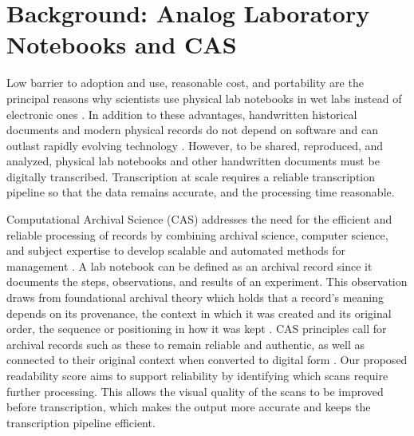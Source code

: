 \documentclass[conference]{IEEEtran}
\begin{document}
\section{Background: Analog Laboratory Notebooks and CAS}
Low barrier to adoption and use, reasonable cost, and portability are the
principal reasons why scientists use physical lab notebooks in wet labs instead
of electronic ones \cite{kanza2017}. In addition to these advantages,
handwritten historical documents and modern physical records do not depend on
software and can outlast rapidly evolving technology \cite{ryan2007}. However,
to be shared, reproduced, and analyzed, physical lab notebooks and other
handwritten documents must be digitally transcribed. Transcription at scale
requires a reliable transcription pipeline so that the data remains accurate,
and the processing time reasonable.

Computational Archival Science (CAS) addresses the need for the efficient and
reliable processing of records by combining archival science, computer science,
and subject expertise to develop scalable and automated methods for management
\cite{marciano2018}. A lab notebook can be defined as an archival record since
it documents the steps, observations, and results of an experiment. This
observation draws from foundational archival theory which holds that a record's
meaning depends on its provenance, the context in which it was created and its
original order, the sequence or positioning in how it was kept
\cite{jenkinson1922}. CAS principles call for archival records such as these to
remain reliable and authentic, as well as connected to their original context
when converted to digital form \cite{hedges2022}. Our proposed readability
score aims to support reliability by identifying which scans require further
processing. This allows the visual quality of the scans to be improved before
transcription, which makes the output more accurate and keeps the transcription
pipeline efficient.
\end{document}
